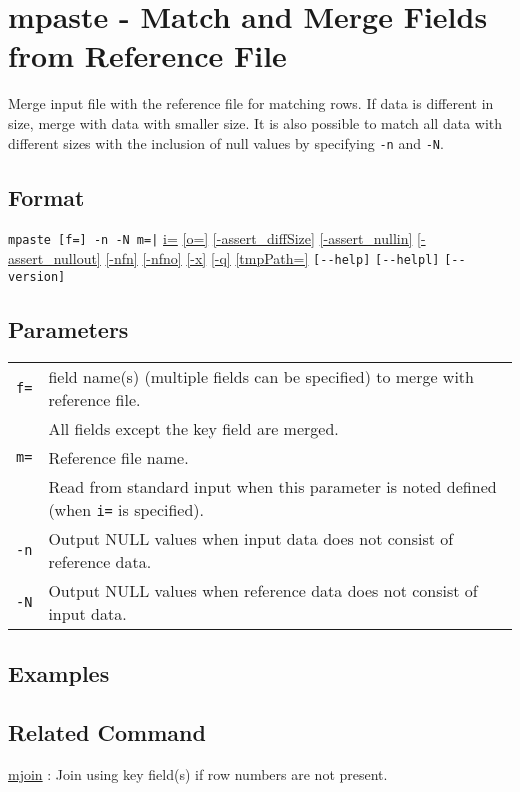 
%

\section{mpaste - Match and Merge Fields from Reference File\label{sect:mpaste}}
Merge input file with the reference file for matching rows. If data is different in size, merge with data with smaller size. It is also possible to match all data with different sizes with the inclusion of null values by specifying \verb|-n| and \verb|-N|.  


\subsection*{Format}
\verb/mpaste [f=] -n -N m=|/   
\hyperref[sect:option_i]{i=}
\hyperref[sect:option_o]{[o=]}
\hyperref[sect:option_assert_diffSize]{[-assert\_diffSize]}
\hyperref[sect:option_assert_nullin]{[-assert\_nullin]}
\hyperref[sect:option_assert_nullout]{[-assert\_nullout]}
\hyperref[sect:option_nfn]{[-nfn]} 
\hyperref[sect:option_nfno]{[-nfno]}  
\hyperref[sect:option_x]{[-x]}
\hyperref[sect:option_q]{[-q]}
\hyperref[sect:option_option_tmppath]{[tmpPath=]}
\verb|[--help]|
\verb|[--helpl]|
\verb|[--version]|\\

\subsection*{Parameters}
\begin{table}[htbp]
{\small
\begin{tabular}{ll}
\verb|f=|    & field name(s) (multiple fields can be specified) to merge with reference file. \\
             & All fields except the key field are merged. \\
\verb|m=|    & Reference file name. \\
             & Read from standard input when this parameter is noted defined (when \verb|i=| is specified).\\
\verb|-n|    & Output NULL values when input data does not consist of reference data. \\
\verb|-N|    & Output NULL values when reference data does not consist of input data. \\
\end{tabular} 
}
\end{table} 

\subsection*{Examples}


\subsection*{Related Command}
\hyperref[sect:mjoin]{mjoin} : Join using key field(s) if row numbers are not present. 

%
